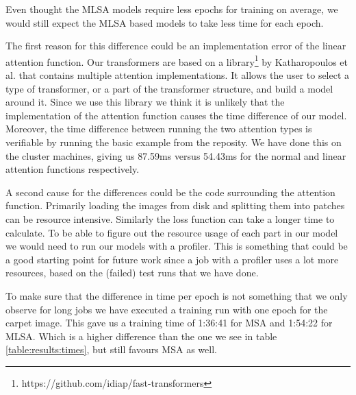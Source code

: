 Even thought the MLSA models require less epochs for training on average, we would still expect the MLSA based models to take less time for each epoch.

The first reason for this difference could be an implementation error of the linear attention function. Our transformers are based on a library\footnote{https://github.com/idiap/fast-transformers} by Katharopoulos et al. that contains multiple attention implementations. It allows the user to select a type of transformer, or a part of the transformer structure, and build a model around it. Since we use this library we think it is unlikely that the implementation of the attention function causes the time difference of our model. Moreover, the time difference between running the two attention types is verifiable by running the basic example from the reposity. We have done this on the cluster machines, giving us 87.59ms versus 54.43ms for the normal and linear attention functions respectively.

A second cause for the differences could be the code surrounding the attention function. Primarily loading the images from disk and splitting them into patches can be resource intensive. Similarly the loss function can take a longer time to calculate. To be able to figure out the resource usage of each part in our model we would need to run our models with a profiler. This is something that could be a good starting point for future work since a job with a profiler uses a lot more resources, based on the (failed) test runs that we have done.

To make sure that the difference in time per epoch is not something that we only observe for long jobs we have executed a training run with one epoch for the carpet image. This gave us a training time of 1:36:41 for MSA and 1:54:22 for MLSA. Which is a higher difference than the one we see in table \ref{table:results:times}, but still favours MSA as well.